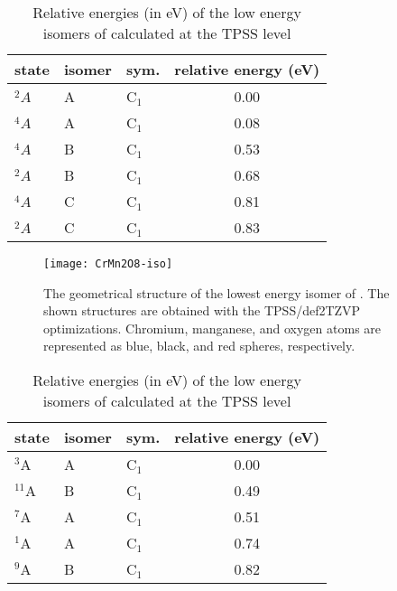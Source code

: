 \begin{table}[]
	\centering
	\caption{Relative energies (in eV) of the low energy isomers of  calculated at the TPSS level}
	\begin{tabular}{@{}lllc@{}}
	\toprule
	state & isomer & sym. & relative energy (eV) \\ \midrule
	$^2A$    & A      & C$_1$   & 0.00                 \\
	$^4A$    & A      & C$_1$   & 0.08                 \\
	$^4A$    & B      & C$_1$   & 0.53                 \\
	$^2A$    & B      & C$_1$   & 0.68                 \\
	$^4A$    & C      & C$_1$   & 0.81                 \\
	$^2A$    & C      & C$_1$   & 0.83                 \\ \bottomrule
	\end{tabular}
\end{table}


\begin{figure}
	\centering
	\texttt{[image: CrMn2O8-iso]}
	\caption{The geometrical structure of the lowest energy isomer of . The shown structures are obtained with the TPSS/def2TZVP optimizations. Chromium, manganese, and oxygen atoms are represented as blue, black, and red spheres, respectively.}
	\label{figs:CrMn2O8}
\end{figure}








\begin{table}[]
	\centering
	\caption{Relative energies (in eV) of the low energy isomers of  calculated at the TPSS level}
	\begin{tabular}{@{}lllc@{}}
	\toprule
	state & isomer & sym. & relative energy (eV) \\ \midrule
	$^3$A      & A      & C$_1$   & 0.00                 \\
	$^{11}$A   & B      & C$_1$   & 0.49                 \\
	$^7$A      & A      & C$_1$   & 0.51                 \\
	$^1$A      & A      & C$_1$   & 0.74                 \\
	$^9$A      & B      & C$_1$   & 0.82                 \\ \bottomrule
	\end{tabular}
\end{table}



